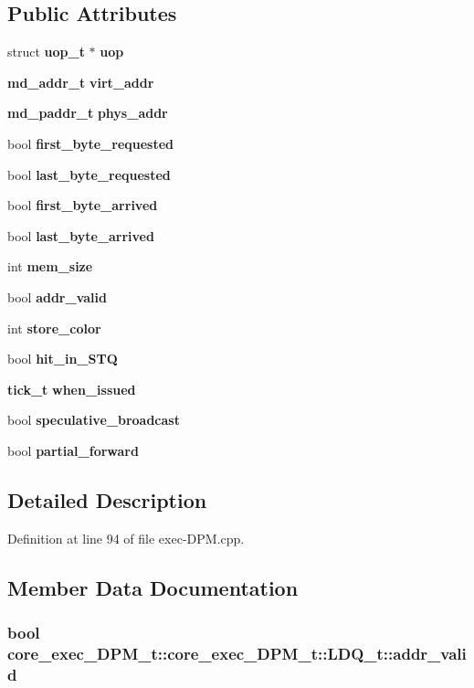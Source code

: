\subsection*{Public Attributes}
\begin{CompactItemize}
\item 
struct {\bf uop\_\-t} $\ast$ {\bf uop}
\item 
{\bf md\_\-addr\_\-t} {\bf virt\_\-addr}
\item 
{\bf md\_\-paddr\_\-t} {\bf phys\_\-addr}
\item 
bool {\bf first\_\-byte\_\-requested}
\item 
bool {\bf last\_\-byte\_\-requested}
\item 
bool {\bf first\_\-byte\_\-arrived}
\item 
bool {\bf last\_\-byte\_\-arrived}
\item 
int {\bf mem\_\-size}
\item 
bool {\bf addr\_\-valid}
\item 
int {\bf store\_\-color}
\item 
bool {\bf hit\_\-in\_\-STQ}
\item 
{\bf tick\_\-t} {\bf when\_\-issued}
\item 
bool {\bf speculative\_\-broadcast}
\item 
bool {\bf partial\_\-forward}
\end{CompactItemize}


\subsection{Detailed Description}


Definition at line 94 of file exec-DPM.cpp.

\subsection{Member Data Documentation}
\subsubsection[{addr\_\-valid}]{\setlength{\rightskip}{0pt plus 5cm}bool core\_\-exec\_\-DPM\_\-t::core\_\-exec\_\-DPM\_\-t::LDQ\_\-t::addr\_\-valid}\label{structcore__exec__DPM__t_1_1LDQ__t_f6227d585f433401f9eb299684cf5ea7}




